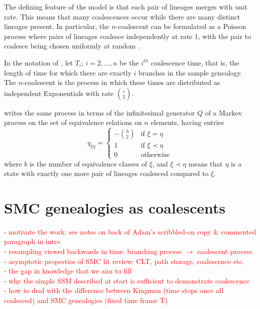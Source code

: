 \documentclass[fleqn]{article}
\theoremstyle{definition}
\begin{document}
The defining feature of the model is that each pair of lineages merges with unit rate. This means that many coalescences occur while there are many distinct lineages present.
In particular, the $n$-coalescent can be formulated as a Poisson process where pairs of lineages coalesce independently at rate 1, with the pair to coalesce being chosen uniformly at random \citep[Section 3.2]{wakeley2009}.

In the notation of \citet{wakeley2009}, let $T_i;\, i=2,\dots,n$ be the $i^{th}$ coalescence time, that is, the length of time for which there are exactly $i$ branches in the sample genealogy. The $n$-coalescent is the process in which these times are distributed as independent Exponentials with rate $\binom{i}{2}$.

\citet{mohle1998} writes the same process in terms of the infinitesimal generator $Q$ of a Markov process on the set of equivalence relations on $n$ elements, having entries
\begin{equation*}
q_{\xi\eta} =
\begin{cases}
-\binom{b}{2} &\text{if }\xi=\eta \\
1 & \text{if }\xi \prec\eta \\
0 & \text{otherwise}
\end{cases}
\end{equation*}
where $b$ is the number of equivalence classes of $\xi$, and $\xi \prec \eta$ means that $\eta$ is a state with exactly one more pair of lineages coalesced compared to $\xi$.
 


\section{SMC genealogies as coalescents}
\textcolor{red}{
- motivate the work: see notes on back of Adam's scribbled-on copy \& commented paragraph in intro\\
- resampling viewed backwards in time: branching process $\to$ coalescent process\\
- asymptotic properties of SMC lit review: CLT, path storage, coalescence etc.\\
- the gap in knowledge that we aim to fill\\
- why the simple SSM described at start is sufficient to demonstrate coalescence\\
- how to deal with the difference between Kingman (time stops once all coalesced) and SMC genealogies (fixed time frame T)
}
\end{document}
